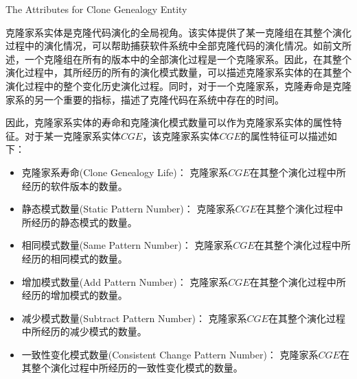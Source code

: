 {The Attributes for Clone Genealogy Entity }

克隆家系实体是克隆代码演化的全局视角。该实体提供了某一克隆组在其整个演化过程中的演化情况，可以帮助捕获软件系统中全部克隆代码的演化情况。如前文所述，一个克隆组在所有的版本中的全部演化过程是一个克隆家系。因此，在其整个演化过程中，其所经历的所有的演化模式数量，可以描述克隆家系实体的在其整个演化过程中的整个变化历史演化过程。同时，对于一个克隆家系，克隆寿命是克隆家系的另一个重要的指标，描述了克隆代码在系统中存在的时间。

因此，克隆家系实体的寿命和克隆演化模式数量可以作为克隆家系实体的属性特征。对于某一克隆家系实体{$CGE$}，该克隆家系实体{$CGE$}的属性特征可以描述如下：

\begin{itemize}
\item
克隆家系寿命(Clone Genealogy  Life)：
克隆家系{$CGE$}在其整个演化过程中所经历的软件版本的数量。
\item
静态模式数量(Static Pattern Number)：
克隆家系{$CGE$}在其整个演化过程中所经历的静态模式的数量。
\item
相同模式数量(Same Pattern Number)：
克隆家系{$CGE$}在其整个演化过程中所经历的相同模式的数量。
\item
增加模式数量(Add Pattern Number)：
克隆家系{$CGE$}在其整个演化过程中所经历的增加模式的数量。
\item
减少模式数量(Subtract Pattern Number)：
克隆家系{$CGE$}在其整个演化过程中所经历的减少模式的数量。
\item
一致性变化模式数量(Consistent Change Pattern Number)：
克隆家系{$CGE$}在其整个演化过程中所经历的一致性变化模式的数量。

\end{itemize}
